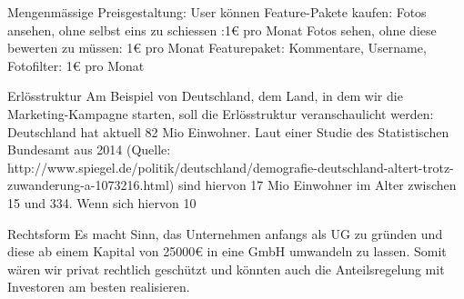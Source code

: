 Mengenmässige Preisgestaltung: User können Feature-Pakete kaufen: 
Fotos ansehen, ohne selbst eins zu schiessen :1€ pro Monat
Fotos sehen, ohne diese bewerten zu müssen: 1€ pro Monat
Featurepaket: Kommentare, Username, Fotofilter: 1€ pro Monat



Erlösstruktur
Am Beispiel von Deutschland, dem Land, in dem wir die Marketing-Kampagne starten, soll die Erlösstruktur veranschaulicht werden:
Deutschland hat aktuell 82 Mio Einwohner. Laut einer Studie des Statistischen Bundesamt aus 2014 (Quelle: http://www.spiegel.de/politik/deutschland/demografie-deutschland-altert-trotz-zuwanderung-a-1073216.html) sind hiervon 17 Mio Einwohner im Alter zwischen 15 und 334. Wenn sich hiervon 10%


Rechtsform
Es macht Sinn, das Unternehmen anfangs als UG zu gründen und diese ab einem Kapital von 25000€ in eine GmbH umwandeln zu lassen. Somit wären wir privat rechtlich geschützt und könnten auch die Anteilsregelung mit Investoren am besten realisieren.

